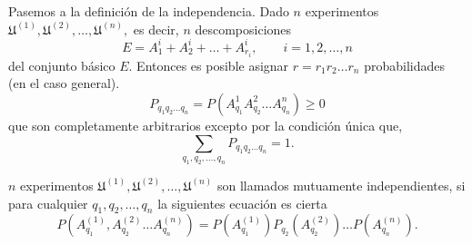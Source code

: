 Pasemos a la definición de la independencia. Dado $n$ experimentos $\mathfrak{U}^{(1)},\mathfrak{U}^{(2)},\ldots,\mathfrak{U}^{(n)},$ es decir, $n$ descomposiciones 
$$E=A_1^{i} +A_2^{i} + \ldots + A_{r_i}^{i}, \qquad i=1,2,\ldots,n$$
del conjunto básico $E$. Entonces es posible asignar $r=r_1 r_2 \ldots r_n$ probabilidades (en el caso general).
$$P_{q_1 q_2 \ldots q_n} = P(A_{q_1}^{1} A_{q_2}^{2} \ldots A_{q_n}^{n}) \geq 0$$
que son completamente arbitrarios excepto por la condición única que,
\begin{equation}
    \sum_{q_1, q_2,\ldots,q_n} P_{q_1 q_2 \ldots q_n} = 1.
\end{equation}

\begin{tcolorbox}[colframe=white]
    \begin{def.} $n$ experimentos $\mathfrak{U}^{(1)}, \mathfrak{U}^{(2)},\ldots,\mathfrak{U}^{(n)}$ son llamados mutuamente independientes, si para cualquier $q_1,q_2,\ldots,q_n$ la siguientes ecuación es cierta
	\begin{equation}
	    P\left(A_{q_1}^{(1)},A_{q_2}^{(2)}\ldots A_{q_n}^{(n)}\right) = P\left(A_{q_1}^{(1)}\right)P_{q_2}\left(A_{q_2}^{(2)}\right)\ldots P\left(A_{q_n}^{(n)}\right). 
	\end{equation}
    \end{def.}

\begin{teo}
\end{teo}


\end{tcolorbox}

